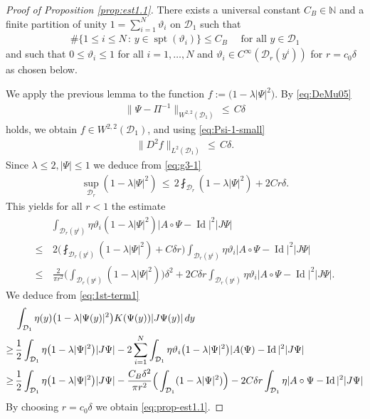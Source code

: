 \documentclass[reqno,makeidx,12pt]{amsart}
\theoremstyle{note}
\theoremstyle{definition}
\begin{document}
\begin{proof}[Proof of Proposition \ref{prop:est1.1}]
There exists a universal constant $C_B\in{\ensuremath{\mathbb{N}}}$ and a finite partition of unity $1=\sum_{i=1}^N \vartheta_i$ on ${\mathcal{D}}_1$ such that 
\begin{gather*}
	{\#}\{1\leq i\leq N\,:\, y\in\operatorname{spt}(\vartheta_i)\}\leq C_B \quad\text{ for all }y\in {\mathcal{D}}_1
\end{gather*}
and such that $0\leq \vartheta_i\leq 1$ for all $i=1,\dots,N$ and $\vartheta_i\in C^\infty({\mathcal{D}}_r(y^i))$ for $r=c_0\delta$ as chosen below.

We apply the previous lemma to the function $f:=\big(1-\lambda |\Psi|^2\big)$. By \eqref{eq:DeMu05} 
\begin{gather}
	\|\Psi-{\Pi}^{-1}\|_{W^{2,2}({\mathcal{D}}_1)} \,\leq\,C\delta \label{eq:g3-3}
\end{gather}
holds, we obtain  $f\in W^{2,2}({\mathcal{D}}_1)$, and using \eqref{eq:Psi-1-small}
\begin{gather}
	\|D^2 f\|_{L^{2}({\mathcal{D}}_1)}\,\leq\, C\delta. \label{eq:g3-4}
\end{gather}
Since $\lambda\leq 2,|\Psi|\leq 1$ we deduce from \eqref{eq:g3-1}
\begin{align}
	\sup_{ {\mathcal{D}}_r} (1-\lambda|\Psi|^2) \,\leq\, 2 \fint_{{\mathcal{D}}_r}  (1-\lambda |\Psi|^2) + 2Cr\delta. \label{eq:g3-99}
\end{align}	
This yields for all $r<1$ the estimate
\begin{align*}
	 &\int_{{\mathcal{D}}_r(y^i)} \eta\vartheta_i(1-\lambda |\Psi|^2)|A\circ\Psi-\operatorname{Id}|^2|J\Psi|\\
	\leq &\, 2\Big( \fint_{{\mathcal{D}}_r(y^i)} (1-\lambda|\Psi|^2) + C\delta r\Big) \int_{{\mathcal{D}}_r(y^i)} \eta\vartheta_i|A\circ\Psi-\operatorname{Id}|^2|J\Psi|\\
	\leq &\, \frac{2}{\pi r^2} \Big(\int_{{\mathcal{D}}_r(y^i)} (1-\lambda|\Psi|^2)\Big)\delta^2 + 2C\delta r \int_{{\mathcal{D}}_r(y^i)}\eta \vartheta_i|A\circ\Psi-\operatorname{Id}|^2|J\Psi|.
\end{align*}
We deduce from \eqref{eq:1st-term1}
\begin{align*}
	&\int_{{\mathcal{D}}_1} \eta(y) \big(1-\lambda|\Psi(y)|^2\big)K(\Psi(y)) |J\Psi(y)|\,dy \notag\\
	\geq\, 
  	&\frac{1}{2}\int_{{\mathcal{D}}_1} \eta\big(1-\lambda |\Psi|^2\big)|J\Psi| - 2\sum_{i=1}^N \int_{{\mathcal{D}}_1} \eta\vartheta_i \big(1-\lambda |\Psi|^2\big)|A(\Psi)-\operatorname{Id}|^2 |J\Psi|\\
	\geq\,& \frac{1}{2} \int_{{\mathcal{D}}_1} \eta \big(1-\lambda|\Psi|^2\big)|J\Psi| - \frac{C_B \delta^2}{\pi r^2} \Big(\int_{{\mathcal{D}}_1} (1-\lambda|\Psi|^2)\Big) - 2C\delta r \int_{{\mathcal{D}}_1} \eta |A\circ\Psi-\operatorname{Id}|^2|J\Psi|
\end{align*}
By choosing $r= c_0\delta$ we obtain \eqref{eq:prop-est1.1}.
\end{proof}
\end{document}
